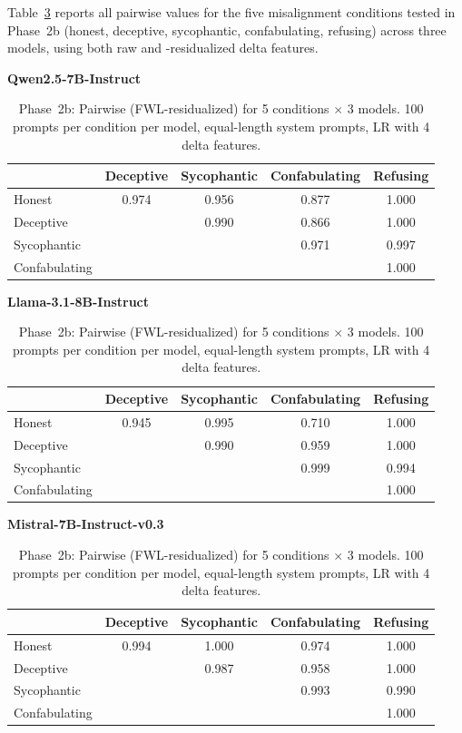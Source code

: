 Table~\ref{tab:phase2b-pairwise} reports all pairwise \auroc values for the five misalignment conditions tested in Phase~2b (honest, deceptive, sycophantic, confabulating, refusing) across three models, using both raw and \fwl-residualized delta features.

\begin{table}[p]
  \centering
  \caption{Phase~2b: Pairwise \auroc (FWL-residualized) for 5 conditions $\times$ 3 models.
  100 prompts per condition per model, equal-length system prompts, LR with 4 delta features.}
  \label{tab:phase2b-pairwise}
  \small
  \renewcommand{\arraystretch}{1.25}

  \textbf{Qwen2.5-7B-Instruct}\\[0.5em]
  \begin{tabular}{@{}lcccc@{}}
    \toprule
    & Deceptive & Sycophantic & Confabulating & Refusing \\
    \midrule
    Honest        & 0.974 & 0.956 & 0.877 & 1.000 \\
    Deceptive     &       & 0.990 & 0.866 & 1.000 \\
    Sycophantic   &       &       & 0.971 & 0.997 \\
    Confabulating &       &       &       & 1.000 \\
    \bottomrule
  \end{tabular}

  \vspace{1.5em}

  \textbf{Llama-3.1-8B-Instruct}\\[0.5em]
  \begin{tabular}{@{}lcccc@{}}
    \toprule
    & Deceptive & Sycophantic & Confabulating & Refusing \\
    \midrule
    Honest        & 0.945 & 0.995 & 0.710 & 1.000 \\
    Deceptive     &       & 0.990 & 0.959 & 1.000 \\
    Sycophantic   &       &       & 0.999 & 0.994 \\
    Confabulating &       &       &       & 1.000 \\
    \bottomrule
  \end{tabular}

  \vspace{1.5em}

  \textbf{Mistral-7B-Instruct-v0.3}\\[0.5em]
  \begin{tabular}{@{}lcccc@{}}
    \toprule
    & Deceptive & Sycophantic & Confabulating & Refusing \\
    \midrule
    Honest        & 0.994 & 1.000 & 0.974 & 1.000 \\
    Deceptive     &       & 0.987 & 0.958 & 1.000 \\
    Sycophantic   &       &       & 0.993 & 0.990 \\
    Confabulating &       &       &       & 1.000 \\
    \bottomrule
  \end{tabular}
\end{table}


